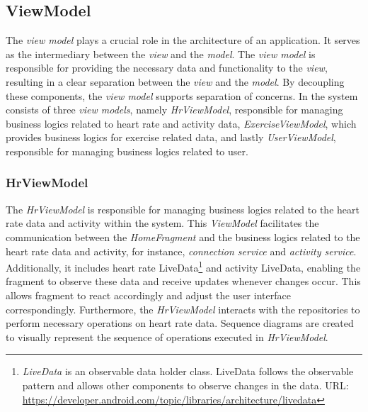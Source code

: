 \subsection{ViewModel}
\label{chap:viewmodel_design}
The \emph{view model} plays a crucial role in the architecture of an application. It serves as the intermediary between the \emph{view} and the \emph{model}.
The \emph{view model} is responsible for providing the necessary data and functionality to the \emph{view}, resulting in a clear separation between the \emph{view} and the \emph{model}.
By decoupling these components, the \emph{view model} supports separation of concerns.
In the system consists of three \emph{view models}, namely \emph{HrViewModel}, responsible for managing business logics related to heart rate and activity data, \emph{ExerciseViewModel}, which provides business logics for exercise related data, and lastly \emph{UserViewModel}, responsible for managing business logics related to user.

\subsubsection{HrViewModel}
The \emph{HrViewModel} is responsible for managing business logics related to the heart rate data and activity within the system.
This \emph{ViewModel} facilitates the communication between the \emph{HomeFragment} and the business logics related to the heart rate data and activity, for instance, \emph{connection service} and \emph{activity service}.
Additionally, it includes heart rate LiveData\footnote{\emph{LiveData} is an observable data holder class. LiveData follows the observable pattern and allows other components to observe changes in the data. URL: \url{https://developer.android.com/topic/libraries/architecture/livedata}} and activity LiveData, enabling the fragment to observe these data and receive updates whenever changes occur. This allows fragment to react accordingly and adjust the user interface correspondingly.
Furthermore, the \emph{HrViewModel} interacts with the repositories to perform necessary operations on heart rate data.
Sequence diagrams are created to visually represent the sequence of operations executed in \emph{HrViewModel}.

